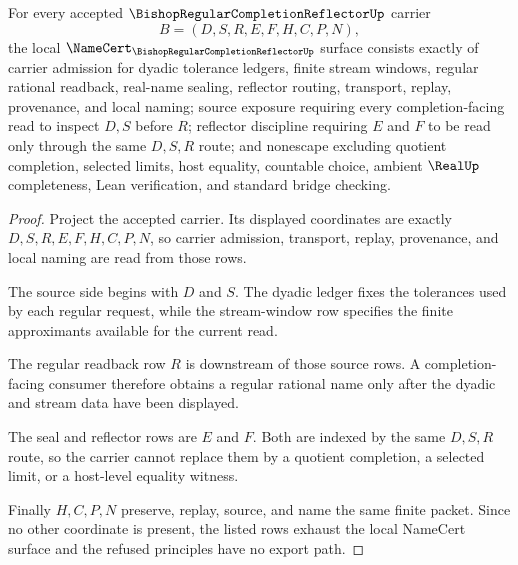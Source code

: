 \begin{theorem}
\label{thm:bishop-regular-completion-reflector-namecert-obligations}
For every accepted $\BishopRegularCompletionReflectorUp$ carrier
$$
B=(D,S,R,E,F,H,C,P,N),
$$
the local $\NameCert_{\BishopRegularCompletionReflectorUp}$ surface consists exactly of carrier admission for dyadic tolerance ledgers, finite stream windows, regular rational readback, real-name sealing, reflector routing, transport, replay, provenance, and local naming; source exposure requiring every completion-facing read to inspect $D,S$ before $R$; reflector discipline requiring $E$ and $F$ to be read only through the same $D,S,R$ route; and nonescape excluding quotient completion, selected limits, host equality, countable choice, ambient $\RealUp$ completeness, Lean verification, and standard bridge checking.
\end{theorem}
\begin{proof}
Project the accepted carrier. Its displayed coordinates are exactly $D,S,R,E,F,H,C,P,N$, so carrier admission, transport, replay, provenance, and local naming are read from those rows.

The source side begins with $D$ and $S$. The dyadic ledger fixes the tolerances used by each regular request, while the stream-window row specifies the finite approximants available for the current read.

The regular readback row $R$ is downstream of those source rows. A completion-facing consumer therefore obtains a regular rational name only after the dyadic and stream data have been displayed.

The seal and reflector rows are $E$ and $F$. Both are indexed by the same $D,S,R$ route, so the carrier cannot replace them by a quotient completion, a selected limit, or a host-level equality witness.

Finally $H,C,P,N$ preserve, replay, source, and name the same finite packet. Since no other coordinate is present, the listed rows exhaust the local NameCert surface and the refused principles have no export path.
\end{proof}


